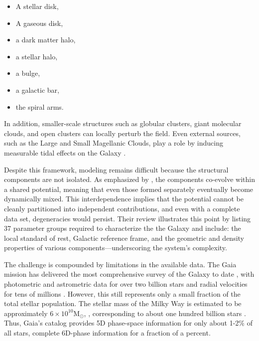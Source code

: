         \twocolumn
        \begin{itemize}
            \item A stellar disk,
            \item A gaseous disk,
            \item a dark matter halo,
            \item a stellar halo,
            \item a bulge,
            \item a galactic bar,
            \item the spiral arms.
        \end{itemize}
        \onecolumn
        In addition, smaller-scale structures such as globular clusters, giant molecular clouds, and open clusters can locally perturb the field. Even external sources, such as the Large and Small Magellanic Clouds, play a role by inducing measurable tidal effects on the Galaxy \citep{2022ApJ...939....2A}.
                
        Despite this framework, modeling remains difficult because the structural components are not isolated. As emphasized by \citet{2016ARA&A..54..529B}, the components co-evolve within a shared potential, meaning that even those formed separately eventually become dynamically mixed. This interdependence implies that the potential cannot be cleanly partitioned into independent contributions, and even with a complete data set, degeneracies would persist. Their review illustrates this point by listing 37 parameter groups required to characterize the the Galaxy and include: the local standard of rest, Galactic reference frame, and the geometric and density properties of various components—underscoring the system's complexity.


        The challenge is compounded by limitations in the available data. The Gaia mission has delivered the most comprehensive survey of the Galaxy to date \citep{2023A&A...674A...1G}, with photometric and astrometric data for over two billion stars and radial velocities for tens of millions \citep{2018A&A...616A..11G}. However, this still represents only a small fraction of the total stellar population. The stellar mass of the Milky Way is estimated to be approximately $6\times10^{10} \mathrm{M}_\odot$,  \citep{2015ApJ...806...96L}, corresponding to about one hundred billion stars \citep[see][for a similar estimate]{2017MNRAS.465...76M}. Thus, Gaia's catalog provides 5D phase-space information for only about 1-2\% of all stars, complete 6D-phase information for a fraction of a percent.
        
